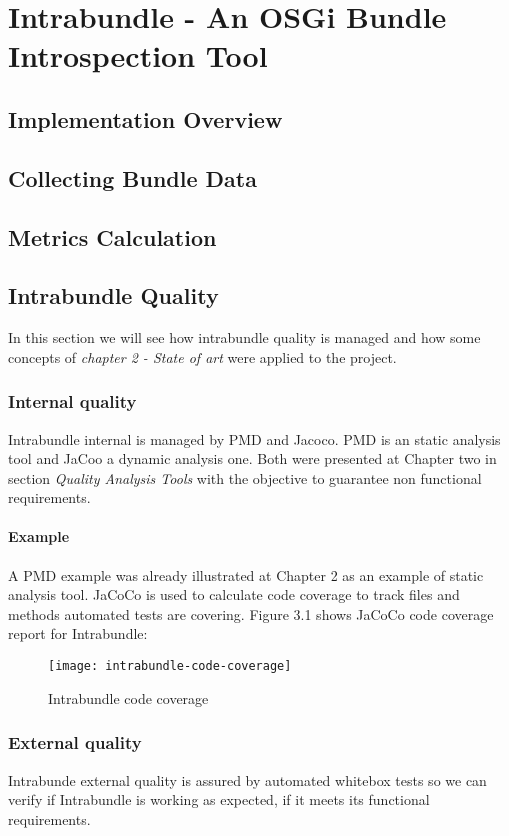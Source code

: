 \chapter{Intrabundle - An OSGi Bundle Introspection Tool}

\section{Implementation Overview}

\section{Collecting Bundle Data}

\section{Metrics Calculation}

\section{Intrabundle Quality}
In this section we will see how intrabundle quality is managed and how some concepts of \textit{chapter 2 - State of art} were applied to the project.
\subsection{Internal quality}
Intrabundle internal is managed by PMD and Jacoco. PMD is an static analysis tool and JaCoo a dynamic analysis one. Both were presented at Chapter two in section \textit{Quality Analysis Tools} with the objective to guarantee non functional requirements.

\subsubsection{Example}
 A PMD example was already illustrated at Chapter 2 as an example of static analysis tool. JaCoCo is used to calculate code coverage to track files and methods automated tests are covering. Figure 3.1 shows JaCoCo code coverage report for Intrabundle:

\begin{figure}[h]
\caption{Intrabundle code coverage}
\texttt{[image: intrabundle-code-coverage]}
\end{figure}

\FloatBarrier

\subsection{External quality}
Intrabunde external quality is assured by automated whitebox tests so we can verify if Intrabundle is working as expected, if it meets its functional requirements.


